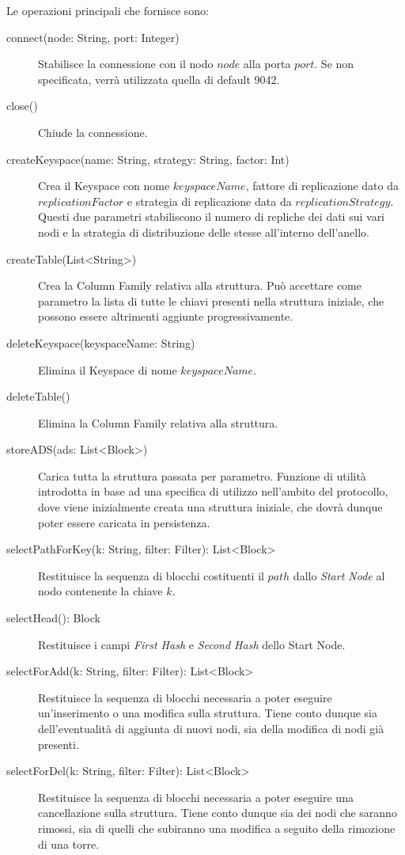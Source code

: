 		Le operazioni principali che fornisce sono:
		\begin{description}
			
			\item[connect(node: String, port: Integer)] Stabilisce la connessione con il nodo $ node $ alla porta $ port $. Se non specificata, verrà utilizzata quella di default 9042.
			\item[close()] Chiude la connessione.
			\item[createKeyspace(name: String, strategy: String, factor: Int)] Crea il Keyspace con nome $ keyspaceName $, fattore di replicazione dato da $ replicationFactor $ e strategia di replicazione data da $ replicationStrategy $. Questi due parametri stabiliscono il numero di repliche dei dati sui vari nodi e la strategia di distribuzione delle stesse all'interno dell'anello.
			\item[createTable(List<String>)] Crea la Column Family relativa alla struttura. Può accettare come parametro la lista di tutte le chiavi presenti nella struttura iniziale, che possono essere altrimenti aggiunte progressivamente.
			\item[deleteKeyspace(keyspaceName: String)] Elimina il Keyspace di nome $ keyspaceName $.
			\item[deleteTable()] Elimina la Column Family relativa alla struttura.
			\item[storeADS(ads: List<Block>)] Carica tutta la struttura passata per parametro. Funzione di utilità introdotta in base ad una specifica di utilizzo nell'ambito del protocollo, dove viene inizialmente creata una struttura iniziale, che dovrà dunque poter essere caricata in persistenza.
			\item[selectPathForKey(k: String, filter: Filter): List<Block>] Restituisce la sequenza di blocchi costituenti il $ path $ dallo \textit{Start Node} al nodo contenente la chiave $ k $.
			\item[selectHead(): Block] Restituisce i campi \textit{First Hash} e \textit{Second Hash} dello Start Node.
			\item[selectForAdd(k: String, filter: Filter): List<Block>] Restituisce la sequenza di blocchi necessaria a poter eseguire un'inserimento o una modifica sulla struttura. Tiene conto dunque sia dell'eventualità di aggiunta di nuovi nodi, sia della modifica di nodi già presenti.
			\item[selectForDel(k: String, filter: Filter): List<Block>] Restituisce la sequenza di blocchi necessaria a poter eseguire una cancellazione sulla struttura. Tiene conto dunque sia dei nodi che saranno rimossi, sia di quelli che subiranno una modifica a seguito della rimozione di una torre.

\end{description}
